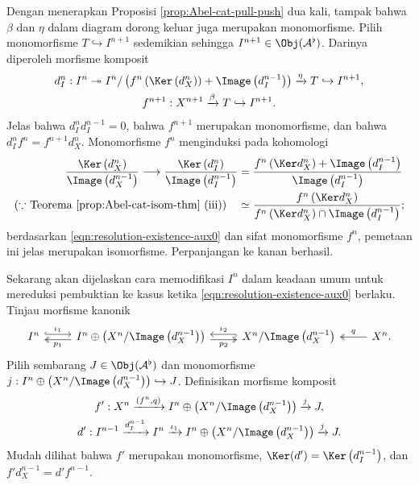 \begin{bukti}
	Dengan menerapkan Proposisi \ref{prop:Abel-cat-pull-push} dua kali, tampak bahwa $\beta$ dan $\eta$ dalam diagram dorong keluar juga merupakan monomorfisme. Pilih monomorfisme $T \hookrightarrow I^{n+1}$ sedemikian sehingga $I^{n+1} \in \Obj(\mathcal{A}^\flat)$. Darinya diperoleh morfisme komposit
	\begin{gather*}
		d_I^n: I^n \twoheadrightarrow I^n / \left( f^n \left( \Ker\left( d_X^n \right) \right) + \Image\left( d_I^{n-1}\right) \right) \xrightarrow{\eta} T \hookrightarrow I^{n+1}, \\
		f^{n+1}: X^{n+1} \xrightarrow{\beta} T \hookrightarrow I^{n+1}.
	\end{gather*}
	Jelas bahwa $d_I^n d_I^{n-1} = 0$, bahwa $f^{n+1}$ merupakan monomorfisme, dan bahwa $d_I^n f^n = f^{n+1} d_X^n$. Monomorfisme $f^n$ menginduksi pada kohomologi
	\begin{align*}
		\frac{\Ker\left( d_X^n \right)}{\Image\left( d_X^{n-1} \right)} \longrightarrow \frac{\Ker\left( d_I^n \right)}{\Image\left( d_I^{n-1} \right)} & =  \frac{ f^n\left(\Ker d_X^n \right) + \Image\left( d_I^{n-1} \right)}{ \Image\left(d_I^{n-1}\right) } \\
		\text{($\because$ Teorema \ref{prop:Abel-cat-isom-thm} (iii))} \quad & \simeq \frac{ f^n\left(\Ker d_X^n \right) }{ f^n\left(\Ker d_X^n \right) \cap \Image\left(d_I^{n-1}\right) };
	\end{align*}
	berdasarkan \eqref{eqn:resolution-existence-aux0} dan sifat monomorfisme $f^n$, pemetaan ini jelas merupakan isomorfisme. Perpanjangan ke kanan berhasil.

	Sekarang akan dijelaskan cara memodifikasi $I^n$ dalam keadaan umum untuk mereduksi pembuktian ke kasus ketika \eqref{eqn:resolution-existence-aux0} berlaku. Tinjau morfisme kanonik
	\[\begin{tikzcd}
		I^n \arrow[hookrightarrow, shift left, r, "\iota_1"] & I^n \oplus \left( X^n / \Image\left( d_X^{n-1} \right) \right) \arrow[twoheadrightarrow, shift left, l, "p_1"] \arrow[twoheadrightarrow, shift right, r, "p_2"'] & X^n / \Image\left( d_X^{n-1} \right) \arrow[hookrightarrow, shift right, l, "\iota_2"'] & X^n \arrow[twoheadrightarrow, l, "q"'] .
	\end{tikzcd}\]
	Pilih sembarang $J \in \Obj(\mathcal{A}^\flat)$ dan monomorfisme $j: I^n \oplus \left( X^n / \Image\left( d_X^{n-1} \right) \right) \hookrightarrow J$. Definisikan morfisme komposit
	\begin{gather*}
		f' : X^n \xrightarrow{(f^n, q)} I^n \oplus \left( X^n / \Image\left( d_X^{n-1} \right) \right) \xrightarrow{j} J, \\
		d': I^{n-1} \xrightarrow{d_I^{n-1}} I^n \xrightarrow{\iota_1} I^n \oplus \left( X^n / \Image\left( d_X^{n-1} \right) \right) \xrightarrow{j} J.
	\end{gather*}
	Mudah dilihat bahwa $f'$ merupakan monomorfisme, $\Ker(d') = \Ker\left( d_I^{n-1} \right)$, dan $f' d_X^{n-1} = d' f^{n-1}$.
	

\end{bukti}
